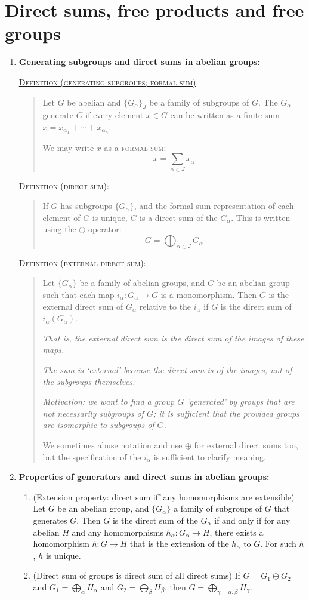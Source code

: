 \documentclass[letterpaper, 12pt]{book}
\newcommand{\defn}[2]{\textsc{\underline{Definition (#1)}:}\begin{quote} #2\end{quote}}
\begin{document}
\section{Direct sums, free products and free groups}
    \begin{enumerate}[resume]
    \item \textbf{Generating subgroups and direct sums in abelian groups:} %

        \defn{generating subgroups; formal sum}{Let $G$ be abelian and $\{G_\alpha\}_J$ be a family of subgroups of $G$. The $G_\alpha$ generate $G$ if every element $x\in G$ can be written as a finite sum $x = x_{\alpha_1} + \cdots + x_{\alpha_n}$.

        We may write $x$ as a \textsc{formal sum}: \[x = \sum_{\alpha\in J} x_\alpha\]}

        \defn{direct sum}{If $G$ has subgroups $\{G_\alpha\}$, and the formal sum representation of each element of $G$ is unique, $G$ is a direct sum of the $G_\alpha$. This is written using the $\oplus$ operator: \[
            G = \bigoplus_{\alpha\in J} G_\alpha
        \]}

        \defn{external direct sum}{Let $\{G_\alpha\}$ be a family of abelian groups, and $G$ be an abelian group such that each map $i_\alpha : G_\alpha \to G$ is a monomorphism. Then $G$ is the external direct sum of $G_\alpha$ relative to the $i_\alpha$ if $G$ is the direct sum of $i_\alpha(G_\alpha)$.

        \textit{That is, the external direct sum is the direct sum of the images of these maps.}

        \textit{The sum is `external' because the direct sum is of the images, not of the subgroups themselves.}

        \textit{Motivation: we want to find a group $G$ `generated' by groups that are not necessarily subgroups of $G$; it is sufficient that the provided groups are isomorphic to subgroups of $G$.}

        We sometimes abuse notation and use $\oplus$ for external direct sums too, but the specification of the $i_\alpha$ is sufficient to clarify meaning.}
        \item \textbf{Properties of generators and direct sums in abelian groups:}
            \begin{enumerate}
            \item (Extension property: direct sum iff any homomorphisms are extensible) Let $G$ be an abelian group, and $\{G_\alpha\}$ a family of subgroups of $G$ that generates $G$. Then $G$ is the direct sum of the $G_\alpha$ if and only if for any abelian $H$ and any homomorphisms $h_\alpha : G_\alpha \to H$, there exists a homomorphism $h: G\to H$ that is the extension of the $h_\alpha$ to $G$. For such $h$, $h$ is unique.
            \item (Direct sum of groups is direct sum of all direct sums) If $G = G_1 \oplus G_2$ and $G_1 = \bigoplus_\alpha H_\alpha$ and $G_2 = \bigoplus_\beta H_\beta$, then $G = \bigoplus_{\gamma = \alpha, \beta} H_\gamma$.


\end{enumerate}
\end{enumerate}
\end{document}
